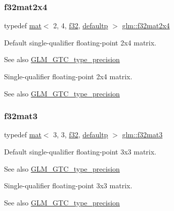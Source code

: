 \subsubsection{\texorpdfstring{f32mat2x4}{f32mat2x4}}
{\footnotesize\ttfamily typedef \hyperlink{structglm_1_1mat}{mat}$<$ 2, 4, \hyperlink{group__gtc__type__precision_ga0ec999b57f5330d9021256e96038df04}{f32}, \hyperlink{namespaceglm_a36ed105b07c7746804d7fdc7cc90ff25a9d21ccd8b5a009ec7eb7677befc3bf51}{defaultp} $>$ \hyperlink{group__gtc__type__precision_ga56deb277c1d5c1f42a80982372b4ed6c}{glm\+::f32mat2x4}}

Default single-\/qualifier floating-\/point 2x4 matrix. \begin{DoxySeeAlso}{See also}
\hyperlink{group__gtc__type__precision}{G\+L\+M\+\_\+\+G\+T\+C\+\_\+type\+\_\+precision}
\end{DoxySeeAlso}
Single-\/qualifier floating-\/point 2x4 matrix. \begin{DoxySeeAlso}{See also}
\hyperlink{group__gtc__type__precision}{G\+L\+M\+\_\+\+G\+T\+C\+\_\+type\+\_\+precision} 
\end{DoxySeeAlso}
\mbox{\label{group__gtc__type__precision_gaf4cf4ab937cf94a202e7decd85cf1e6d}} 
\subsubsection{\texorpdfstring{f32mat3}{f32mat3}}
{\footnotesize\ttfamily typedef \hyperlink{structglm_1_1mat}{mat}$<$ 3, 3, \hyperlink{group__gtc__type__precision_ga0ec999b57f5330d9021256e96038df04}{f32}, \hyperlink{namespaceglm_a36ed105b07c7746804d7fdc7cc90ff25a9d21ccd8b5a009ec7eb7677befc3bf51}{defaultp} $>$ \hyperlink{group__gtc__type__precision_gaf4cf4ab937cf94a202e7decd85cf1e6d}{glm\+::f32mat3}}

Default single-\/qualifier floating-\/point 3x3 matrix. \begin{DoxySeeAlso}{See also}
\hyperlink{group__gtc__type__precision}{G\+L\+M\+\_\+\+G\+T\+C\+\_\+type\+\_\+precision}
\end{DoxySeeAlso}
Single-\/qualifier floating-\/point 3x3 matrix. \begin{DoxySeeAlso}{See also}
\hyperlink{group__gtc__type__precision}{G\+L\+M\+\_\+\+G\+T\+C\+\_\+type\+\_\+precision} 
\end{DoxySeeAlso}
\mbox{\label{group__gtc__type__precision_ga924b933089d954df062aa8d0735fc005}} 
